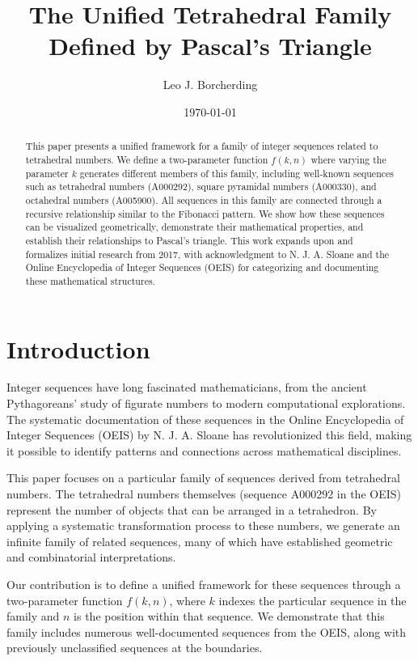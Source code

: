 \documentclass[12pt,a4paper]{article}
\title{The Unified Tetrahedral Family Defined by Pascal's Triangle}
\author{Leo J. Borcherding}
\date{\today}
\begin{document}
\maketitle

\begin{abstract}
This paper presents a unified framework for a family of integer sequences related to tetrahedral numbers. We define a two-parameter function $f(k,n)$ where varying the parameter $k$ generates different members of this family, including well-known sequences such as tetrahedral numbers (A000292), square pyramidal numbers (A000330), and octahedral numbers (A005900). All sequences in this family are connected through a recursive relationship similar to the Fibonacci pattern. We show how these sequences can be visualized geometrically, demonstrate their mathematical properties, and establish their relationships to Pascal's triangle. This work expands upon and formalizes initial research from 2017, with acknowledgment to N. J. A. Sloane and the Online Encyclopedia of Integer Sequences (OEIS) for categorizing and documenting these mathematical structures.
\end{abstract}

\section{Introduction}

Integer sequences have long fascinated mathematicians, from the ancient Pythagoreans' study of figurate numbers to modern computational explorations. The systematic documentation of these sequences in the Online Encyclopedia of Integer Sequences (OEIS) by N. J. A. Sloane has revolutionized this field, making it possible to identify patterns and connections across mathematical disciplines.

This paper focuses on a particular family of sequences derived from tetrahedral numbers. The tetrahedral numbers themselves (sequence A000292 in the OEIS) represent the number of objects that can be arranged in a tetrahedron. By applying a systematic transformation process to these numbers, we generate an infinite family of related sequences, many of which have established geometric and combinatorial interpretations.

Our contribution is to define a unified framework for these sequences through a two-parameter function $f(k,n)$, where $k$ indexes the particular sequence in the family and $n$ is the position within that sequence. We demonstrate that this family includes numerous well-documented sequences from the OEIS, along with previously unclassified sequences at the boundaries.
\end{document}

